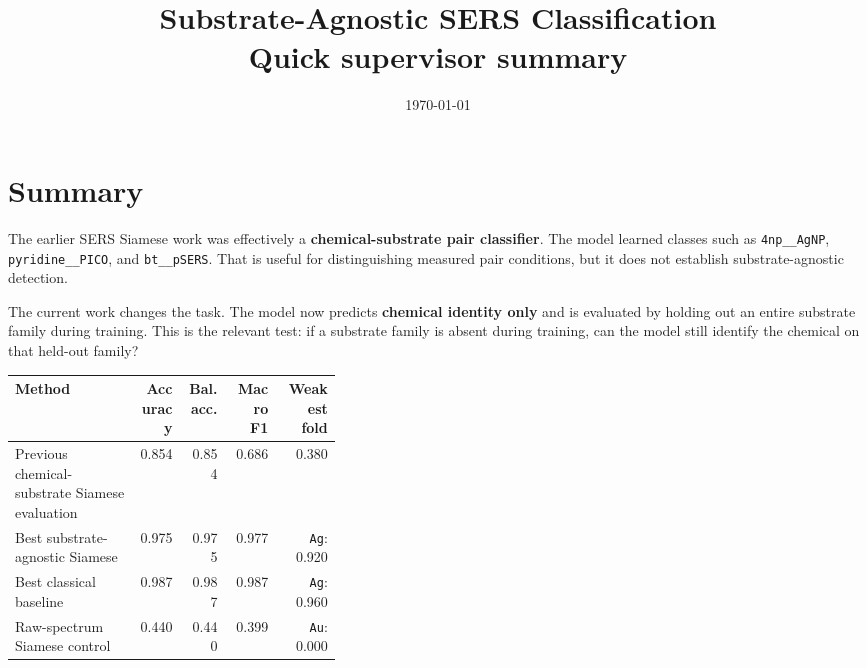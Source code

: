 \documentclass[11pt]{article}
\title{\textbf{Substrate-Agnostic SERS Classification}\\
\large Quick supervisor summary}
\author{}
\date{\today}
\begin{document}
\maketitle

\section*{Summary}

The earlier SERS Siamese work was effectively a \textbf{chemical-substrate pair classifier}. The model learned classes such as \texttt{4np\_\_AgNP}, \texttt{pyridine\_\_PICO}, and \texttt{bt\_\_pSERS}. That is useful for distinguishing measured pair conditions, but it does not establish substrate-agnostic detection.

The current work changes the task. The model now predicts \textbf{chemical identity only} and is evaluated by holding out an entire substrate family during training. This is the relevant test: if a substrate family is absent during training, can the model still identify the chemical on that held-out family?

\begin{center}
\begin{tabular}{p{0.38\linewidth}rrrr}
\toprule
\textbf{Method} & \textbf{Accuracy} & \textbf{Bal. acc.} & \textbf{Macro F1} & \textbf{Weakest fold} \\
\midrule
Previous chemical-substrate Siamese evaluation & 0.854 & 0.854 & 0.686 & 0.380 \\
Best substrate-agnostic Siamese & 0.975 & 0.975 & 0.977 & \texttt{Ag}: 0.920 \\
Best classical baseline & 0.987 & 0.987 & 0.987 & \texttt{Ag}: 0.960 \\
Raw-spectrum Siamese control & 0.440 & 0.440 & 0.399 & \texttt{Au}: 0.000 \\
\bottomrule
\end{tabular}
\end{center}
\end{document}
